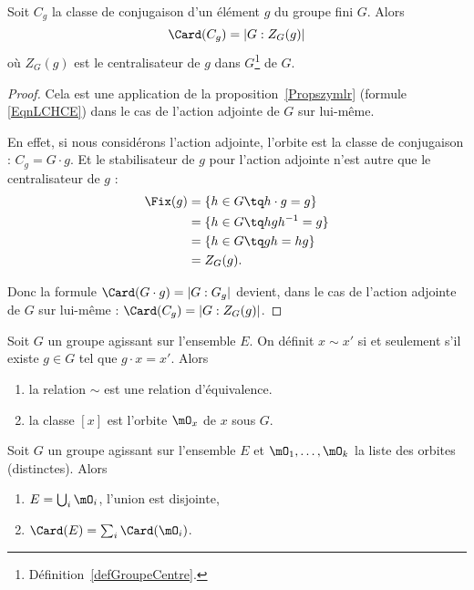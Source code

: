 \begin{corollary}       \label{CORooRRVHooTyCjZZ}
    Soit \( C_g\) la classe de conjugaison d'un élément  \( g\) du groupe fini \( G\). Alors
    \begin{equation}
        \Card(C_g)=| G:Z_G(g) |
    \end{equation}
    où $Z_G(g)$ est le centralisateur de \( g\) dans \( G\)\footnote{Définition~\ref{defGroupeCentre}.} de \( G\).
\end{corollary}

\begin{proof}
    Cela est une application de la proposition~\ref{Propszymlr} (formule \eqref{EqnLCHCE}) dans le cas de l'action adjointe de \( G\) sur lui-même.

    En effet, si nous considérons l'action adjointe, l'orbite est la classe de conjugaison : \( C_g=G\cdot g\). Et le stabilisateur de \( g\) pour l'action adjointe n'est autre que le centralisateur de \( g\) :
    \begin{subequations}
        \begin{align}
        \Fix(g)&=\{ h\in G\tq h\cdot g=g \}\\
        &= \{ h\in G\tq hgh^{-1}=g \}\\
        &=\{ h\in G\tq gh=hg \}\\
        &=Z_G(g).
        \end{align}
    \end{subequations}

    Donc la formule \( \Card(G\cdot g)=| G:G_g |\) devient, dans le cas de l'action adjointe de \( G\) sur lui-même : \( \Card(C_g)=| G:Z_G(g) |\).
\end{proof}

\begin{lemma}
    Soit \( G\) un groupe agissant sur l'ensemble \( E\). On définit \( x\sim x'\) si et seulement s'il existe \( g\in G\) tel que \( g\cdot x=x'\). Alors
    \begin{enumerate}
        \item
            la relation \( \sim\) est une relation d'équivalence.
        \item
            la classe \( [x]\) est l'orbite \( \mO_x\) de \( x\) sous \( G\).
    \end{enumerate}
\end{lemma}

\begin{corollary} \label{CorARFVMP}
    Soit \( G\) un groupe agissant sur l'ensemble \( E\) et \( \mO_1,\ldots, \mO_k  \) la liste des orbites (distinctes). Alors
    \begin{enumerate}
        \item
            \( E=\bigcup_i\mO_i\), l'union est disjointe,
        \item
            \( \Card(E)=\sum_i\Card(\mO_i)\).
    \end{enumerate}
\end{corollary}

